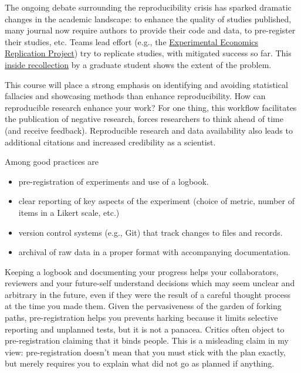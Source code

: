 \documentclass[
  11pt,
  letterpaper,
]{scrbook}
\providecommand{\tightlist}{%
  \setlength{\itemsep}{0pt}\setlength{\parskip}{0pt}}\usepackage{longtable,booktabs,array}
\theoremstyle{definition}
\theoremstyle{remark}
\begin{document}
The ongoing debate surrounding the reproducibility crisis has sparked
dramatic changes in the academic landscape: to enhance the quality of
studies published, many journal now require authors to provide their
code and data, to pre-register their studies, etc. Teams lead effort
(e.g., the
\href{https://experimentaleconreplications.com/studies.html}{Experimental
Economics Replication Project}) try to replicate studies, with mitigated
success so far. This
\href{https://devonprice.medium.com/questionable-research-practices-ive-taken-part-in-754b74dcaa51}{inside
recollection} by a graduate student shows the extent of the problem.

This course will place a strong emphasis on identifying and avoiding
statistical fallacies and showcasing methods than enhance
reproducibility. How can reproducible research enhance your work? For
one thing, this workflow facilitates the publication of negative
research, forces researchers to think ahead of time (and receive
feedback). Reproducible research and data availability also leads to
additional citations and increased credibility as a scientist.

Among good practices are

\begin{itemize}
\tightlist
\item
  pre-registration of experiments and use of a logbook.
\item
  clear reporting of key aspects of the experiment (choice of metric,
  number of items in a Likert scale, etc.)
\item
  version control systems (e.g., Git) that track changes to files and
  records.
\item
  archival of raw data in a proper format with accompanying
  documentation.
\end{itemize}

Keeping a logbook and documenting your progress helps your
collaborators, reviewers and your future-self understand decisions which
may seem unclear and arbitrary in the future, even if they were the
result of a careful thought process at the time you made them. Given the
pervasiveness of the garden of forking paths, pre-registration helps you
prevents harking because it limits selective reporting and unplanned
tests, but it is not a panacea. Critics often object to pre-registration
claiming that it binds people. This is a misleading claim in my view:
pre-registration doesn't mean that you must stick with the plan exactly,
but merely requires you to explain what did not go as planned if
anything.
\end{document}
